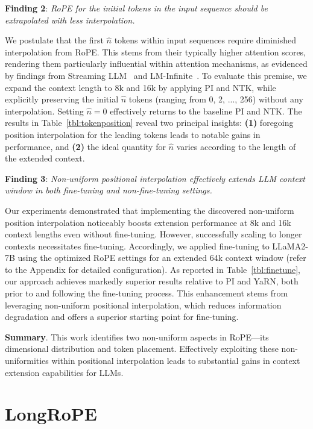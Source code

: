 \textbf{Finding 2}: \textit{RoPE for the initial tokens in the input sequence should be extrapolated with less interpolation.} 

We postulate that the first $\hat{n}$ tokens within input sequences require diminished interpolation from RoPE. This stems from their typically higher attention scores, rendering them particularly influential within attention mechanisms, as evidenced by findings from Streaming LLM~\cite{streamingllm} and LM-Infinite~\cite{han2023lminfinite}. To evaluate this premise, we expand the context length to 8k and 16k by applying PI and NTK, while explicitly preserving the initial $\hat n$ tokens (ranging from 0, 2, ..., 256) without any interpolation. Setting $\hat n = 0$ effectively returns to the baseline PI and NTK. The results in Table~\ref{tbl:tokenposition} reveal two principal insights: \textbf{(1)} foregoing position interpolation for the leading tokens leads to notable gains in performance, and \textbf{(2)} the ideal quantity for $\hat n$ varies according to the length of the extended context.

\textbf{Finding 3}: \textit{Non-uniform positional interpolation effectively extends LLM context window in both fine-tuning and non-fine-tuning settings.} 

Our experiments demonstrated that implementing the discovered non-uniform position interpolation noticeably boosts extension performance at 8k and 16k context lengths even without fine-tuning. However, successfully scaling to longer contexts necessitates fine-tuning. Accordingly, we applied fine-tuning to LLaMA2-7B using the optimized RoPE settings for an extended 64k context window (refer to the Appendix for detailed configuration). As reported in Table~\ref{tbl:finetune}, our approach achieves markedly superior results relative to PI and YaRN, both prior to and following the fine-tuning process. This enhancement stems from leveraging non-uniform positional interpolation, which reduces information degradation and offers a superior starting point for fine-tuning.

\textbf{Summary}. This work identifies two non-uniform aspects in RoPE—its dimensional distribution and token placement. Effectively exploiting these non-uniformities within positional interpolation leads to substantial gains in context extension capabilities for LLMs.

\section{LongRoPE}

